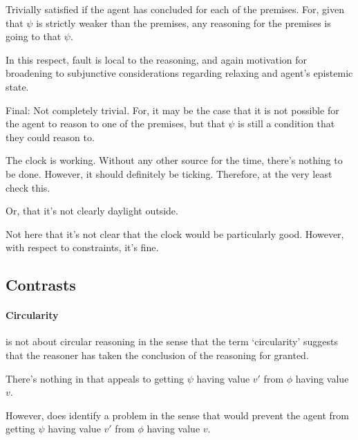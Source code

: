 \begin{note}
  Trivially satisfied if the agent has concluded for each of the premises.
  For, given that \(\psi\) is strictly weaker than the premises, any reasoning for the premises is going to \indicateV{} that \(\psi\).

  In this respect, fault is local to the reasoning, and again motivation for broadening to subjunctive considerations regarding relaxing and agent's epistemic state.

  Final: Not completely trivial.
  For, it may be the case that it is not possible for the agent to reason to one of the premises, but that \(\psi\) is still a condition that they could reason to.
\end{note}

\begin{note}
  \begin{illustration}
    The clock is working.
    Without any other source for the time, there's nothing to be done.
    However, it should definitely be ticking.
    Therefore, at the very least check this.
  \end{illustration}
  Or, that it's not clearly daylight outside.

  Not here that it's not clear that the clock would be particularly good.
  However, with respect to constraints, it's fine.
\end{note}

\newpage

\subsection{Contrasts}
\label{sec:contrasts}

\paragraph{Circularity}

\begin{note}
  \ideaCS{} is not about circular reasoning in the sense that the term `circularity' suggests that the reasoner has taken the conclusion of the reasoning for granted.

  There's nothing in \ideaCS{} that appeals to getting \(\psi\) having value \(v'\) from \(\phi\) having value \(v\).

  However, does identify a problem in the sense that would prevent the agent from getting \(\psi\) having value \(v'\) from \(\phi\) having value \(v\).
\end{note}

